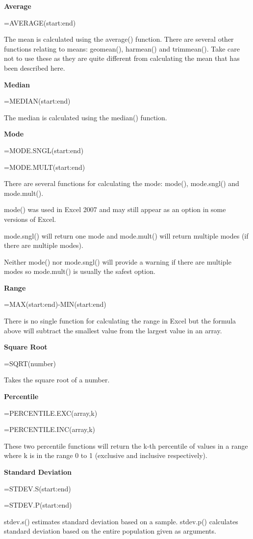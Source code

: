 \documentclass[
]{book}
\begin{document}
\textbf{Average}

=AVERAGE(start:end)

The mean is calculated using the average() function. There are several other functions relating to means: geomean(), harmean() and trimmean(). Take care not to use these as they are quite different from calculating the mean that has been described here.

\textbf{Median}

=MEDIAN(start:end)

The median is calculated using the median() function.

\textbf{Mode}

=MODE.SNGL(start:end)

=MODE.MULT(start:end)

There are several functions for calculating the mode: mode(), mode.sngl() and mode.mult().

mode() was used in Excel 2007 and may still appear as an option in some versions of Excel.

mode.sngl() will return one mode and mode.mult() will return multiple modes (if there are multiple modes).

Neither mode() nor mode.sngl() will provide a warning if there are multiple modes so mode.mult() is usually the safest option.

\textbf{Range}

=MAX(start:end)-MIN(start:end)

There is no single function for calculating the range in Excel but the formula above will subtract the smallest value from the largest value in an array.

\textbf{Square Root}

=SQRT(number)

Takes the square root of a number.

\textbf{Percentile}

=PERCENTILE.EXC(array,k)

=PERCENTILE.INC(array,k)

These two percentile functions will return the k-th percentile of values in a range where k is in the range 0 to 1 (exclusive and inclusive respectively).

\textbf{Standard Deviation}

=STDEV.S(start:end)

=STDEV.P(start:end)

stdev.s() estimates standard deviation based on a sample. stdev.p() calculates standard deviation based on the entire population given as arguments.
\end{document}
